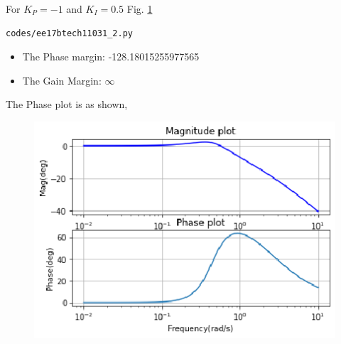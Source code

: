 \begin{enumerate}[label=\thesection.\arabic*.,ref=\thesection.\theenumi]
For $K_{P} = -1$ and $K_{I} = 0.5$ Fig. \ref{fig:ee17btech11031_2} 

\begin{lstlisting}
codes/ee17btech11031_2.py
\end{lstlisting}
\begin{itemize}
    \item The Phase margin: -128.18015255977565
    \item The Gain Margin: $\infty$
\end{itemize}
%
The Phase plot is as shown,
\begin{figure}[!h]
  \centering
  \includegraphics[width=\columnwidth]{./figs/ee17btech11031/ee17btech11031_2.eps}
  \caption{}
  \label{fig:ee17btech11031_2}
\end{figure}

\end{enumerate}
